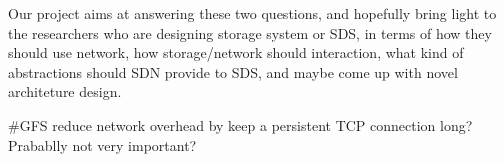 Our project aims at answering these two questions, and hopefully bring light to the researchers who are designing storage system or SDS, in terms of how they should use network, how storage/network should interaction, what kind of abstractions should SDN provide to SDS, and maybe come up with novel architeture design.




#GFS reduce network overhead by keep a persistent TCP connection long? Prabablly not very important?
